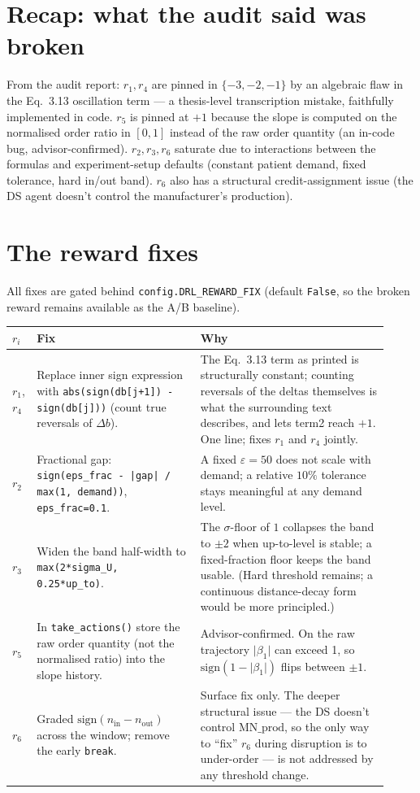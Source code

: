 \documentclass[11pt,letterpaper]{article}
\newcommand{\code}[1]{\texttt{\small #1}}
\begin{document}
\section{Recap: what the audit said was broken}

From the audit report: $r_1, r_4$ are pinned in
$\{-3,-2,-1\}$ by an algebraic flaw in the Eq.~3.13 oscillation term --- a
thesis-level transcription mistake, faithfully implemented in code. $r_5$ is
pinned at $+1$ because the slope is computed on the normalised order ratio in
$[0,1]$ instead of the raw order quantity (an in-code bug, advisor-confirmed).
$r_2, r_3, r_6$ saturate due to interactions between the formulas and
experiment-setup defaults (constant patient demand, fixed tolerance, hard
in/out band). $r_6$ also has a structural credit-assignment issue (the DS
agent doesn't control the manufacturer's production).

\section{The reward fixes}

All fixes are gated behind \code{config.DRL\_REWARD\_FIX} (default
\code{False}, so the broken reward remains available as the A/B baseline).

\begin{longtable}{p{0.06\linewidth} p{0.40\linewidth} p{0.46\linewidth}}
\toprule
\textbf{$r_i$} & \textbf{Fix} & \textbf{Why} \\
\midrule
$r_1$,$r_4$ & Replace inner sign expression with
\code{abs(sign(db[j+1]) - sign(db[j]))} (count true reversals of $\Delta b$). &
The Eq.~3.13 term as printed is structurally constant; counting reversals of
the deltas themselves is what the surrounding text describes, and lets term2
reach $+1$. One line; fixes $r_1$ and $r_4$ jointly. \\
\addlinespace
$r_2$ & Fractional gap:
\code{sign(eps\_frac - |gap| / max(1, demand))}, \code{eps\_frac=0.1}. &
A fixed $\varepsilon=50$ does not scale with demand; a relative $10\%$
tolerance stays meaningful at any demand level. \\
\addlinespace
$r_3$ & Widen the band half-width to
\code{max(2*sigma\_U, 0.25*up\_to)}. &
The $\sigma$-floor of $1$ collapses the band to $\pm 2$ when up-to-level is
stable; a fixed-fraction floor keeps the band usable.  (Hard threshold remains;
a continuous distance-decay form would be more principled.) \\
\addlinespace
$r_5$ & In \code{take\_actions()} store the raw order quantity (not the
normalised ratio) into the slope history. &
Advisor-confirmed.  On the raw trajectory $\lvert\beta_1\rvert$ can exceed 1,
so $\mathrm{sign}(1-\lvert\beta_1\rvert)$ flips between $\pm 1$. \\
\addlinespace
$r_6$ & Graded $\mathrm{sign}(n_{\text{in}} - n_{\text{out}})$ across the
window; remove the early \code{break}. &
Surface fix only.  The deeper structural issue --- the DS doesn't control
$\text{MN\_prod}$, so the only way to ``fix'' $r_6$ during disruption is to
under-order --- is not addressed by any threshold change. \\
\bottomrule
\end{longtable}
\end{document}
